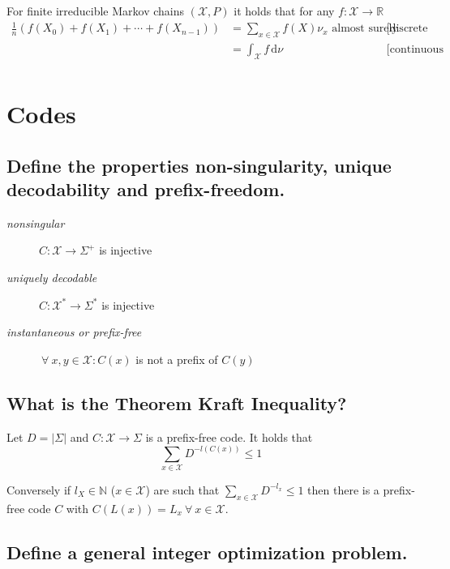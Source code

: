 \documentclass[a4paper]{article}
\newcommand\fall{\:\forall\:}
\newcommand\dt{\,\text{d}}
\newcommand\key[1]{\textit{#1}}
\newcommand\card[1]{\left|#1\right|}
\theoremstyle{definition}
\begin{document}
For finite irreducible Markov chains $(\mathcal{X}, P)$ it holds that for any $f: \mathcal{X} \rightarrow \mathbb{R}$
\begin{align*}
  \frac1n\left(f(X_0) + f(X_1) + \dotsb + f(X_{n-1})\right)
    &= \sum_{x \in \mathcal{X}} f(X) \nu_x \text{ almost surely}   && \text{ [discrete case]} \\
    &= \int_\mathcal{X} f \dt\nu                                   && \text{ [continuous case]} \\
\end{align*}

\section{Codes}

\subsection{Define the properties non-singularity, unique decodability and prefix-freedom.}

\begin{description}
  \item[\key{nonsingular}]
    $C: \mathcal{X} \rightarrow \Sigma^+$ is injective
  \item[\key{uniquely decodable}]
    $C: \mathcal{X}^* \rightarrow \Sigma^*$ is injective
  \item[\key{instantaneous or prefix-free}]
    $\fall x,y \in \mathcal{X}: C(x)$ is not a prefix of $C(y)$
\end{description}

\subsection{What is the Theorem Kraft Inequality?}

Let $D = \card{\Sigma}$ and $C: \mathcal{X} \rightarrow \Sigma$ is a prefix-free code. It holds that
\[
  \sum_{x \in \mathcal{X}} D^{-l(C(x))} \leq 1
\]

Conversely if $l_X \in \mathbb{N}$ ($x \in \mathcal{X}$) are such that $\sum_{x \in \mathcal{X}} D^{-l_x} \leq 1$
then there is a prefix-free code $C$ with $C(L(x)) = L_x \fall x \in \mathcal{X}$.

\subsection{Define a general integer optimization problem.}
\end{document}
